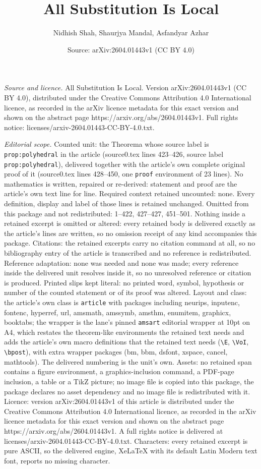 \documentclass[10pt,a4paper]{amsart}
\title[All Substitution Is Local]{All Substitution Is Local}
\author{Nidhish Shah, Shaurjya Mandal, Asfandyar Azhar}
\date{Source: arXiv:2604.01443v1 (CC BY 4.0)}
\begin{document}
\maketitle

\noindent\emph{Source and licence.} All Substitution Is Local. Version arXiv:2604.01443v1 (CC BY 4.0), distributed under the Creative Commons Attribution 4.0 International licence, as recorded in the arXiv licence metadata for this exact version and shown on the abstract page https://arxiv.org/abs/2604.01443v1. Full rights notice: licenses/arxiv-2604.01443-CC-BY-4.0.txt.\par\smallskip

\noindent\textit{Editorial scope.} Counted unit: the Theorema whose source label is \texttt{prop:polyhedral} in the article (source0.tex lines 423--426, source label \texttt{prop:polyhedral}), delivered together with the article's own complete original proof of it (source0.tex lines 428--450, one \texttt{proof} environment of 23 lines). No mathematics is written, repaired or re-derived: statement and proof are the article's own text line for line. Required context retained uncounted: none. Every definition, display and label of those lines is retained unchanged. Omitted from this package and not redistributed: 1--422, 427--427, 451--501. Nothing inside a retained excerpt is omitted or altered: every retained body is delivered exactly as the article's lines are written, so no omission receipt of any kind accompanies this package. Citations: the retained excerpts carry no citation command at all, so no bibliography entry of the article is transcribed and no reference is redistributed. Reference adaptation: none was needed and none was made; every reference inside the delivered unit resolves inside it, so no unresolved reference or citation is produced. Printed slips kept literal: no printed word, symbol, hypothesis or number of the counted statement or of its proof was altered. Layout and class: the article's own class is \texttt{article} with packages including neurips, inputenc, fontenc, hyperref, url, amsmath, amssymb, amsthm, enumitem, graphicx, booktabs; the wrapper is the lane's pinned \texttt{amsart} editorial wrapper at 10pt on A4, which restates the theorem-like environments the retained text needs and adds the article's own macro definitions that the retained text needs (\texttt{\textbackslash E}, \texttt{\textbackslash VoI}, \texttt{\textbackslash bpost}), with extra wrapper packages (bm, bbm, dsfont, xspace, cancel, mathtools). The delivered numbering is the unit's own. Assets: no retained span contains a figure environment, a graphics-inclusion command, a PDF-page inclusion, a table or a TikZ picture; no image file is copied into this package, the package declares no asset dependency and no image file is redistributed with it. Licence: version arXiv:2604.01443v1 of this article is distributed under the Creative Commons Attribution 4.0 International licence, as recorded in the arXiv licence metadata for this exact version and shown on the abstract page https://arxiv.org/abs/2604.01443v1. A full rights notice is delivered at licenses/arxiv-2604.01443-CC-BY-4.0.txt. Characters: every retained excerpt is pure ASCII, so the delivered engine, XeLaTeX with its default Latin Modern text font, reports no missing character.
\end{document}
